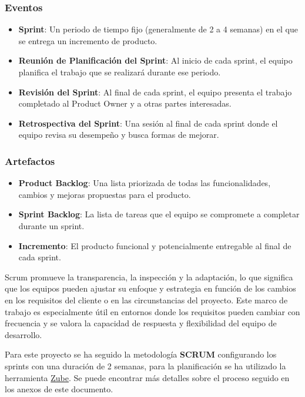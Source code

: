\subsubsection{Eventos}

\begin{itemize}
   \item \textbf{Sprint}: Un periodo de tiempo fijo (generalmente de 2 a 4 semanas) en el que se entrega un incremento de producto.
   \item \textbf{Reunión de Planificación del Sprint}: Al inicio de cada sprint, el equipo planifica el trabajo que se realizará durante ese periodo.
   \item \textbf{Revisión del Sprint}: Al final de cada sprint, el equipo presenta el trabajo completado al Product Owner y a otras partes interesadas.
   \item \textbf{Retrospectiva del Sprint}: Una sesión al final de cada sprint donde el equipo revisa su desempeño y busca formas de mejorar.
\end{itemize}

\subsubsection{Artefactos}

\begin{itemize}
\item \textbf{Product Backlog}: Una lista priorizada de todas las funcionalidades, cambios y mejoras propuestas para el producto.
\item \textbf{Sprint Backlog}: La lista de tareas que el equipo se compromete a completar durante un sprint.
\item \textbf{Incremento}: El producto funcional y potencialmente entregable al final de cada sprint.
\end{itemize}

Scrum promueve la transparencia, la inspección y la adaptación, lo que significa que los equipos pueden ajustar su enfoque y estrategia en función de los cambios en los requisitos del cliente o en las circunstancias del proyecto. Este marco de trabajo es especialmente útil en entornos donde los requisitos pueden cambiar con frecuencia y se valora la capacidad de respuesta y flexibilidad del equipo de desarrollo.

Para este proyecto se ha seguido la metodología \textbf{SCRUM} configurando los sprints con una duración de 2 semanas,
para la planificación se ha utilizado la herramienta \href{https://zube.io/tgs1003/tfg_2023_2024}{Zube}.
Se puede encontrar más detalles sobre el proceso seguido en los anexos de este documento.

